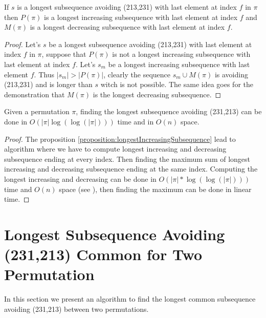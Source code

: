 \documentclass[a4paper]{llncs}
\newcommand{\ptext}{\pi}
\newcounter{num}
\begin{document}
	\begin{proposition}
	\label{proposition:longestIncreasingSubsequence}
	If $s$ is a longest subsequence avoiding (213,231) with last element at index $f$ in $\pi$ then
	$P(\pi)$ is a longest increasing subsequence with last element at index $f$ and
	$M(\pi)$ is a longest decreasing subsequence with last element at index $f$.
	\end{proposition}

	\begin{proof}
	Let's $s$ be a longest subsequence avoiding (213,231) with last element at index $f$ in $\pi$,
	suppose that $P(\pi)$ is not a longest increasing subsequence with last element at index $f$. Let's $s_m$ be a longest increasing subsequence with last element $f$.
	Thus $|s_m|>|P(\pi)|$, clearly the sequence $s_m \cup M(\pi)$
	is avoiding (213,231) and is longer than $s$ witch is not possible.
	The same idea goes for the demonstration that $M(\pi)$ is the longest decreasing subsequence.
	\end{proof}

	\begin{proposition}
	Given a permutation $\pi$,
	finding the longest subsequence avoiding (231,213)
	can be done in $O(|\ptext|\log(\log(|\ptext|)))$ time and in $O(n)$ space.
	\end{proposition}

	\begin{proof}
	The proposition \ref{proposition:longestIncreasingSubsequence} lead to algorithm
	where we have to compute longest increasing and decreasing subsequence ending at every index. Then finding the maximum sum of longest increasing and decreasing subsequence ending at the same index.
	Computing the longest increasing and decreasing can be done in $O(|\ptext|*\log(\log(|\ptext|)))$ time and $O(n)$ space (see \cite{Bespamyatnikh00enumeratinglongest}), then finding the maximum can be done in linear time.
	\end{proof}


\section{Longest Subsequence Avoiding \\(231,213) Common for Two Permutation}
\label{section:LCS common 2 permutations}

In this section we present an algorithm to find
the longest common subsequence avoiding (231,213)
between two permutations.\\
\end{document}
